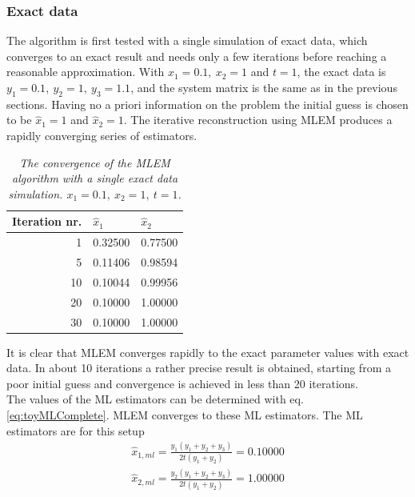 \documentclass[report,12pt]{report}
\begin{document}
\subsubsection*{Exact data}
The algorithm is first tested with a single simulation of exact data, which converges to an exact result and needs  only a few iterations before reaching a reasonable approximation. With $x_1 = 0.1,\ x_2 = 1$ and $t = 1$, the exact data is $y_1 = 0.1,\ y_2 = 1,\ y_3 = 1.1$, and the system matrix is the same as in the previous sections. Having no a priori information on the problem the initial guess is chosen to be $\hat x_1 = 1$ and $\hat x_2 = 1$. The iterative reconstruction using MLEM produces a rapidly converging series of estimators.\newline

\setlength\intextsep{0pt}
\begin{table}
	\begin{tabular}{|r| l| l|}
		\hline
    	{Iteration nr.}	&${\hat x_1}$	&${\hat x_2}$\\
    	\hline
1 & 0.32500 & 0.77500\\ 
5 & 0.11406 & 0.98594\\ 
10 & 0.10044 & 0.99956\\ 
20 & 0.10000 & 1.00000\\ 
30 & 0.10000 & 1.00000\\ 
    	\hline
	\end{tabular}
	\caption{\emph{The convergence of the MLEM algorithm with a single exact data simulation. $x_1 = 0.1,\ x_2 = 1,\ t=1$.}}
    \label{tab:mlemExact}
\end{table} 
\intextsep{}

It is clear that MLEM converges rapidly to the exact parameter values with exact data. In about 10 iterations a rather precise result is obtained, starting from a poor initial guess and convergence is achieved in less than 20 iterations.\\

The values of the ML estimators can be determined with eq. \ref{eq:toyMLComplete}. MLEM converges to these ML estimators. The ML estimators are for this setup
\begin{align} 
	\hat x_{1, ml} = \frac{y_1(y_1 + y_2 + y_3)}{2t(y_1 + y_2)} = 0.10000
	\nonumber\\
	\hat x_{2, ml} = \frac{y_2(y_1 + y_2 + y_3)}{2t(y_1 + y_{2})} =1.00000  
	\nonumber
\end{align}
\end{document}
